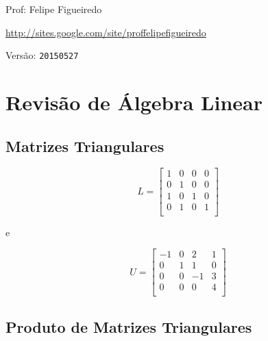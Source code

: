 \documentclass[a4paper]{article}
\begin{document}
\parbox[c]{.825\textwidth}{\raggedright%
{Prof: Felipe Figueiredo\par}
{\url{http://sites.google.com/site/proffelipefigueiredo}\par}
}

Versão: \verb|20150527|



\section*{Revisão de Álgebra Linear}

\subsection*{Matrizes Triangulares}
\begin{displaymath}
  L = \begin{bmatrix}
    1&0&0&0\\
    0&1&0&0\\
    1&0&1&0\\
    0&1&0&1\\
  \end{bmatrix}
\end{displaymath}

e 

\begin{displaymath}
  U = \begin{bmatrix}
    -1&0&2&1\\
    0&1&1&0\\
    0&0&-1&3\\
    0&0&0&4\\
  \end{bmatrix}
\end{displaymath}

\subsection*{Produto de Matrizes Triangulares}
\end{document}
